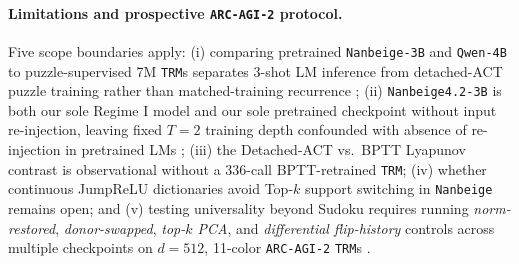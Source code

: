 \documentclass[10pt,letterpaper]{article}
\begin{document}
\paragraph{Limitations and prospective \texttt{ARC-AGI-2} protocol.} Five scope boundaries apply: (i) comparing pretrained \texttt{Nanbeige-3B} and \texttt{Qwen-4B} to puzzle-supervised 7M \texttt{TRM}s separates 3-shot LM inference from detached-ACT puzzle training rather than matched-training recurrence \cite{sesodia2026inside}; (ii) \texttt{Nanbeige4.2-3B} is both our sole Regime I model and our sole pretrained checkpoint without input re-injection, leaving fixed $T=2$ training depth confounded with absence of re-injection in pretrained LMs \cite{olszowiec2026monitoring}; (iii) the Detached-ACT vs.\ BPTT Lyapunov contrast is observational without a 336-call BPTT-retrained \texttt{TRM}; (iv) whether continuous JumpReLU dictionaries avoid Top-$k$ support switching in \texttt{Nanbeige} remains open; and (v) testing universality beyond Sudoku requires running \emph{norm-restored}, \emph{donor-swapped}, \emph{top-$k$ PCA}, and \emph{differential flip-history} controls across multiple checkpoints on $d=512$, 11-color \texttt{ARC-AGI-2} \texttt{TRM}s \cite{jolicoeur2025trm}.



\end{document}
